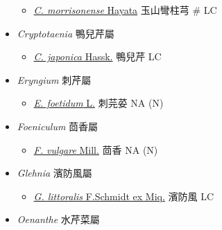 \begin{itemize}
  \begin{itemize}
        \item[] \href{http://www.theplantlist.org/tpl1.1/search?q=Conioselinum+morrisonense}{\textit{C. morrisonense} Hayata}   玉山彎柱芎  \# LC
  \end{itemize}
 \item[] \textit{Cryptotaenia} 鴨兒芹屬
                                
  \begin{itemize}
        \item[] \href{http://www.theplantlist.org/tpl1.1/search?q=Cryptotaenia+japonica}{\textit{C. japonica} Hassk.}   鴨兒芹   LC
  \end{itemize}
 \item[] \textit{Eryngium} 刺芹屬
                                
  \begin{itemize}
        \item[] \href{http://www.theplantlist.org/tpl1.1/search?q=Eryngium+foetidum}{\textit{E. foetidum} L.}   刺芫荽   NA (N)
  \end{itemize}
 \item[] \textit{Foeniculum} 茴香屬
                                
  \begin{itemize}
        \item[] \href{http://www.theplantlist.org/tpl1.1/search?q=Foeniculum+vulgare}{\textit{F. vulgare} Mill.}   茴香   NA (N)
  \end{itemize}
 \item[] \textit{Glehnia} 濱防風屬
                                
  \begin{itemize}
        \item[] \href{http://www.theplantlist.org/tpl1.1/search?q=Glehnia+littoralis}{\textit{G. littoralis} F.Schmidt ex Miq.}   濱防風   LC
  \end{itemize}
 \item[] \textit{Oenanthe} 水芹菜屬
                                

\end{itemize}

